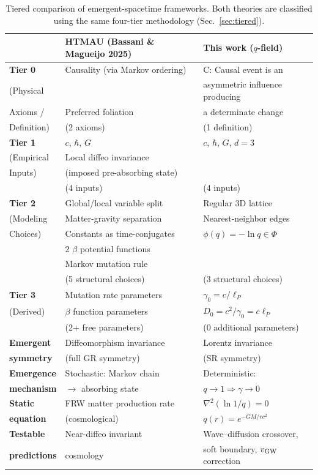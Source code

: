 \documentclass[aps,prd,twocolumn,showpacs,superscriptaddress,preprintnumbers]{revtex4-2}
\begin{document}
\begin{table}[h]
\centering
\caption{Tiered comparison of emergent-spacetime frameworks. Both theories are classified using the same four-tier methodology (Sec.~\ref{sec:tiered}).}
\label{tab:compare_htmau}
\begin{tabular}{p{}p{}p{}}
\toprule
& \textbf{HTMAU (Bassani \& Magueijo 2025)} & \textbf{This work ($q$-field)} \\
\midrule
\textbf{Tier 0} & Causality (via Markov ordering) & C: Causal event is an \\
(Physical & & asymmetric influence producing \\
Axioms / & Preferred foliation & a determinate change \\
Definition) & (2 axioms) & (1 definition) \\
\midrule
\textbf{Tier 1} & $c$, $\hbar$, $G$ & $c$, $\hbar$, $G$, $d=3$ \\
(Empirical & Local diffeo invariance & \\
Inputs) & (imposed pre-absorbing state) & \\
& (4 inputs) & (4 inputs) \\
\midrule
\textbf{Tier 2} & Global/local variable split & Regular 3D lattice \\
(Modeling & Matter-gravity separation & Nearest-neighbor edges \\
Choices) & Constants as time-conjugates & $\phi(q)=-\ln q\in\Phi$ \\
& 2 $\beta$ potential functions & \\
& Markov mutation rule & \\
& (5 structural choices) & (3 structural choices) \\
\midrule
\textbf{Tier 3} & Mutation rate parameters & $\gamma_0=c/\ell_P$ \\
(Derived) & $\beta$ function parameters & $D_0=c^2/\gamma_0=c\ell_P$ \\
& (2+ free parameters) & (0 additional parameters) \\
\midrule
\textbf{Emergent} & Diffeomorphism invariance & Lorentz invariance \\
\textbf{symmetry} & (full GR symmetry) & (SR symmetry) \\
\midrule
\textbf{Emergence} & Stochastic: Markov chain & Deterministic: \\
\textbf{mechanism} & $\to$ absorbing state & $q\to1 \Rightarrow \gamma\to0$ \\
\midrule
\textbf{Static} & FRW matter production rate & $\nabla^2(\ln 1/q)=0$ \\
\textbf{equation} & (cosmological) & $q(r)=e^{-GM/rc^2}$ \\
\midrule
\textbf{Testable} & Near-diffeo invariant & Wave--diffusion crossover, \\
\textbf{predictions} & cosmology & soft boundary, $v_{\rm GW}$ correction \\
\bottomrule
\end{tabular}
\end{table}
\end{document}
